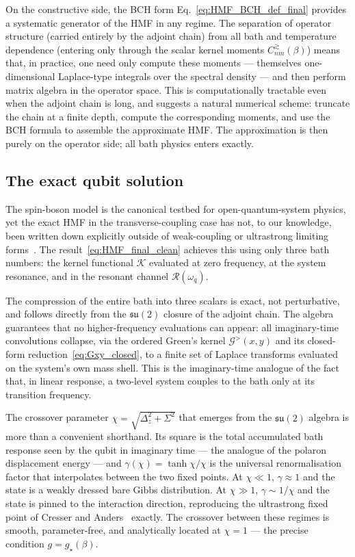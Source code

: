 On the constructive side, the BCH form
Eq.~\eqref{eq:HMF_BCH_def_final} provides a systematic generator of the
HMF in any regime.
The separation of operator structure (carried entirely by the adjoint chain)
from all bath and temperature dependence (entering only through the scalar
kernel moments $C^\gtrsim_{nm}(\beta)$) means that, in practice, one need
only compute these moments --- themselves one-dimensional Laplace-type
integrals over the spectral density --- and then perform matrix algebra
in the operator space.
This is computationally tractable even when the adjoint chain is long, and
suggests a natural numerical scheme: truncate the chain at a finite depth,
compute the corresponding moments, and use the BCH formula to assemble the
approximate HMF.
The approximation is then purely on the operator side; all bath physics
enters exactly.

\subsection*{The exact qubit solution}

The spin-boson model is the canonical testbed for open-quantum-system physics,
yet the exact HMF in the transverse-coupling case has not, to our knowledge,
been written down explicitly outside of weak-coupling or ultrastrong limiting
forms~\cite{cresserWeakUltrastrongCoupling2021a,hovhannisyanHamiltonianMeanForce2020,millerHamiltonianMeanForce2018}.
The result~\eqref{eq:HMF_final_clean} achieves this using only three bath
numbers: the kernel functional $\mathcal{K}$ evaluated at zero frequency,
at the system resonance, and in the resonant channel $\mathcal{R}(\omega_q)$.

The compression of the entire bath into three scalars is exact,
not perturbative, and follows directly from the $\mathfrak{su}(2)$ closure
of the adjoint chain.
The algebra guarantees that no higher-frequency evaluations can appear:
all imaginary-time convolutions collapse, via the ordered Green's kernel
$\mathcal{G}^>(x,y)$ and its closed-form reduction~\eqref{eq:Gxy_closed},
to a finite set of Laplace transforms evaluated on the system's own mass shell.
This is the imaginary-time analogue of the fact that, in linear response, a
two-level system couples to the bath only at its transition frequency.

The crossover parameter $\chi = \sqrt{\Delta_z^2 + \Sigma^2}$ that emerges
from the $\mathfrak{su}(2)$ algebra is more than a convenient shorthand.
Its square is the total accumulated bath response seen by the qubit in
imaginary time --- the analogue of the polaron displacement energy ---
and $\gamma(\chi) = \tanh\chi/\chi$ is the universal renormalisation factor
that interpolates between the two fixed points.
At $\chi \ll 1$, $\gamma \approx 1$ and the state is a weakly dressed
bare Gibbs distribution.
At $\chi \gg 1$, $\gamma \sim 1/\chi$ and the state is pinned to the
interaction direction, reproducing the ultrastrong fixed point of
Cresser and Anders~\cite{cresserWeakUltrastrongCoupling2021a,hovhannisyanHamiltonianMeanForce2020} exactly.
The crossover between these regimes is smooth, parameter-free, and
analytically located at $\chi = 1$ --- the precise condition $g = g_\star(\beta)$.

